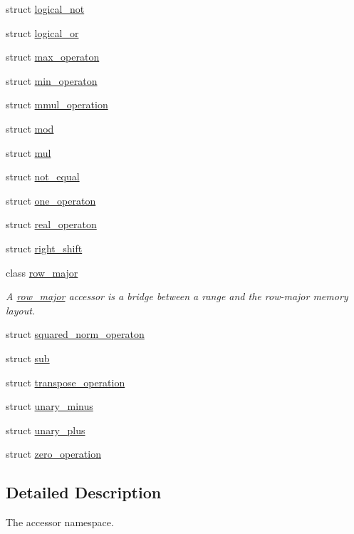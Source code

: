 \begin{DoxyCompactItemize}
struct \hyperlink{structgko_1_1accessor_1_1logical__not}{logical\+\_\+not}
\item 
struct \hyperlink{structgko_1_1accessor_1_1logical__or}{logical\+\_\+or}
\item 
struct \hyperlink{structgko_1_1accessor_1_1max__operaton}{max\+\_\+operaton}
\item 
struct \hyperlink{structgko_1_1accessor_1_1min__operaton}{min\+\_\+operaton}
\item 
struct \hyperlink{structgko_1_1accessor_1_1mmul__operation}{mmul\+\_\+operation}
\item 
struct \hyperlink{structgko_1_1accessor_1_1mod}{mod}
\item 
struct \hyperlink{structgko_1_1accessor_1_1mul}{mul}
\item 
struct \hyperlink{structgko_1_1accessor_1_1not__equal}{not\+\_\+equal}
\item 
struct \hyperlink{structgko_1_1accessor_1_1one__operaton}{one\+\_\+operaton}
\item 
struct \hyperlink{structgko_1_1accessor_1_1real__operaton}{real\+\_\+operaton}
\item 
struct \hyperlink{structgko_1_1accessor_1_1right__shift}{right\+\_\+shift}
\item 
class \hyperlink{classgko_1_1accessor_1_1row__major}{row\+\_\+major}
\begin{DoxyCompactList}\small\item\em A \hyperlink{classgko_1_1accessor_1_1row__major}{row\+\_\+major} accessor is a bridge between a range and the row-\/major memory layout. \end{DoxyCompactList}\item 
struct \hyperlink{structgko_1_1accessor_1_1squared__norm__operaton}{squared\+\_\+norm\+\_\+operaton}
\item 
struct \hyperlink{structgko_1_1accessor_1_1sub}{sub}
\item 
struct \hyperlink{structgko_1_1accessor_1_1transpose__operation}{transpose\+\_\+operation}
\item 
struct \hyperlink{structgko_1_1accessor_1_1unary__minus}{unary\+\_\+minus}
\item 
struct \hyperlink{structgko_1_1accessor_1_1unary__plus}{unary\+\_\+plus}
\item 
struct \hyperlink{structgko_1_1accessor_1_1zero__operation}{zero\+\_\+operation}
\end{DoxyCompactItemize}


\subsection{Detailed Description}
The accessor namespace. 